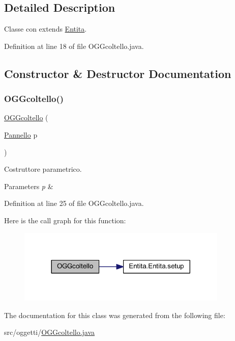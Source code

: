 \subsection{Detailed Description}
Classe con extends \hyperlink{namespace_entita}{Entita}. 

Definition at line 18 of file O\+G\+Gcoltello.\+java.



\subsection{Constructor \& Destructor Documentation}
\mbox{\label{classoggetti_1_1_o_g_gcoltello_a813ca00c0be23b40227a4b6262c108ef}} 
\subsubsection{\texorpdfstring{O\+G\+Gcoltello()}{OGGcoltello()}}
{\footnotesize\ttfamily \hyperlink{classoggetti_1_1_o_g_gcoltello}{O\+G\+Gcoltello} (\begin{DoxyParamCaption}\item[{\hyperlink{classa_1_1survival_1_1game_1_1_pannello}{Pannello}}]{p }\end{DoxyParamCaption})}



Costruttore parametrico. 


\begin{DoxyParams}{Parameters}
{\em p} & \\
\hline
\end{DoxyParams}


Definition at line 25 of file O\+G\+Gcoltello.\+java.

Here is the call graph for this function\+:
\nopagebreak
\begin{figure}[H]
\begin{center}
\leavevmode
\includegraphics[width=284pt]{classoggetti_1_1_o_g_gcoltello_a813ca00c0be23b40227a4b6262c108ef_cgraph}
\end{center}
\end{figure}


The documentation for this class was generated from the following file\+:\begin{DoxyCompactItemize}
\item 
src/oggetti/\hyperlink{_o_g_gcoltello_8java}{O\+G\+Gcoltello.\+java}\end{DoxyCompactItemize}
